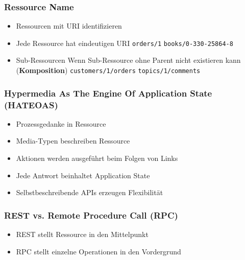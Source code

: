 \documentclass[a4paper, landscape, 8pt]{scrartcl}
\begin{document}
\begin{multicols*}{4}
        \subsubsection{Ressource Name}
        \begin{itemize}
            \item Ressourcen mit URI identifizieren
            \item Jede Ressource hat eindeutigen URI
            \subitem \texttt{orders/1}
            \subitem \texttt{books/0-330-25864-8}
            \item Sub-Ressourcen
            \subitem Wenn Sub-Ressource ohne Parent nicht existieren kann (\textbf{Komposition})
            \subitem \texttt{customers/1/orders}
            \subitem \texttt{topics/1/comments}
        \end{itemize}
        
        \subsubsection{Hypermedia As The Engine Of Application State {\tiny(HATEOAS)}}
        \begin{itemize}
            \item Prozessgedanke in Ressource
            \item Media-Typen beschreiben Ressource
            \item Aktionen werden ausgeführt beim Folgen von Links
            \item Jede Antwort beinhaltet Application State
            \item Selbstbeschreibende APIs erzeugen Flexibilität
        \end{itemize}
        
        \subsubsection{REST vs. Remote Procedure Call (RPC)}
        \begin{itemize}
            \item REST stellt Ressource in den Mittelpunkt
            \item RPC stellt einzelne Operationen in den Vordergrund
        \end{itemize}


\end{multicols*}
\end{document}
